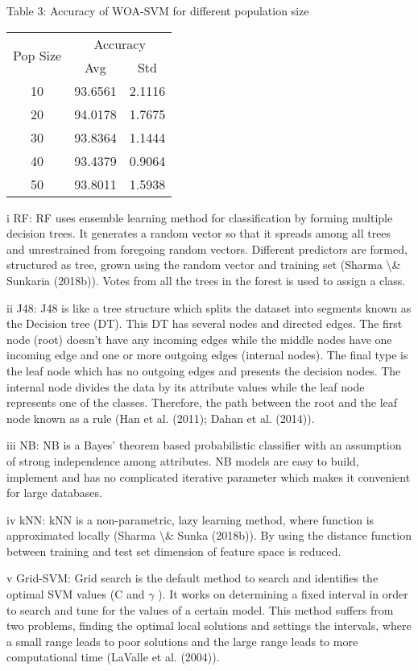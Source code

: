 \documentclass{article}
\begin{document}
Table 3: Accuracy of WOA-SVM for different population size

\begin{tabular}{|c|c|c|}\hline
\multirow{2}{*}{Pop Size} & \multicolumn{2}{c|}{Accuracy} \\ \cline{2-3}
  & Avg & Std \\ \hline
10 & 93.6561 & 2.1116 \\ \hline
20 & 94.0178 & 1.7675 \\ \hline
30 & 93.8364 & 1.1444 \\ \hline
40 & 93.4379 & 0.9064 \\ \hline
50 & 93.8011 & 1.5938 \\ \hline
\end{tabular}

i RF: RF uses ensemble learning method for classification by forming multiple decision trees. It generates a random vector so that it spreads among all trees and unrestrained from foregoing random vectors. Different predictors are formed, structured as tree, grown using the random vector and training set (Sharma \textbackslash{}& Sunkaria (2018b)). Votes from all the trees in the forest is used to assign a class.

ii J48: J48 is like a tree structure which splits the dataset into segments known as the Decision tree (DT). This DT has several nodes and directed edges. The first node (root) doesn’t have any incoming edges while the middle nodes have one incoming edge and one or more outgoing edges (internal nodes). The final type is the leaf node which has no outgoing edges and presents the decision nodes. The internal node divides the data by its attribute values while the leaf node represents one of the classes. Therefore, the path between the root and the leaf node known as a rule (Han et al. (2011); Dahan et al. (2014)).

iii NB: NB is a Bayes’ theorem based probabilistic classifier with an assumption of strong independence among attributes. NB models are easy to build, implement and has no complicated iterative parameter which makes it convenient for large databases.

iv kNN: kNN is a non-parametric, lazy learning method, where function is approximated locally (Sharma \textbackslash{}& Sunka (2018b)). By using the distance function between training and test set dimension of feature space is reduced.

v Grid-SVM: Grid search is the default method to search and identifies the optimal SVM values (C and $\gamma$ ). It works on determining a fixed interval in order to search and tune for the values of a certain model. This method suffers from two problems, finding the optimal local solutions and settings the intervals, where a small range leads to poor solutions and the large range leads to more computational time (LaValle et al. (2004)).
\end{document}
